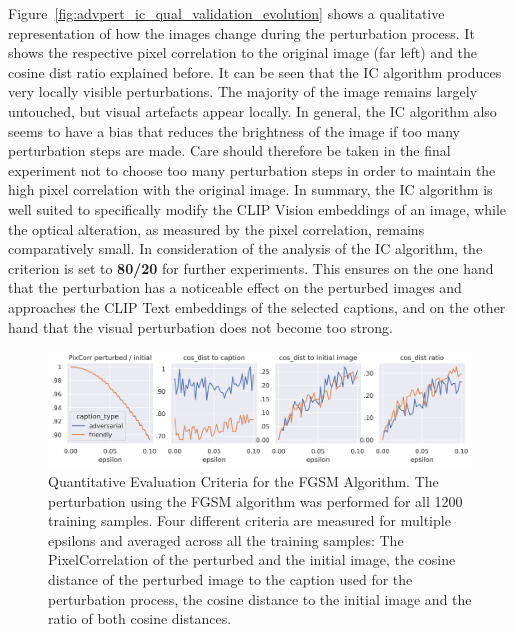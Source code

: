 Figure~\ref{fig:advpert_ic_qual_validation_evolution} shows a qualitative representation of how the images change during the perturbation process. It shows the respective pixel correlation to the original image (far left) and the cosine dist ratio explained before. It can be seen that the IC algorithm produces very locally visible perturbations. The majority of the image remains largely untouched, but visual artefacts appear locally. In general, the IC algorithm also seems to have a bias that reduces the brightness of the image if too many perturbation steps are made. Care should therefore be taken in the final experiment not to choose too many perturbation steps in order to maintain the high pixel correlation with the original image. In summary, the IC algorithm is well suited to specifically modify the CLIP Vision embeddings of an image, while the optical alteration, as measured by the pixel correlation, remains comparatively small. In consideration of the analysis of the IC algorithm, the criterion is set to \textbf{80/20} for further experiments. This ensures on the one hand that the perturbation has a noticeable effect on the perturbed images and approaches the CLIP Text embeddings of the selected captions, and on the other hand that the visual perturbation does not become too strong. 


\begin{figure}[ht]
    \centering
    \includegraphics[width=1\textwidth]{plots/advpert_validation_fgsm_loss_curves.png}
    \caption[Quantitative Evaluation Criteria for the FGSM Algorithm]{Quantitative Evaluation Criteria for the FGSM Algorithm. The perturbation using the FGSM algorithm was performed for all 1200 training samples. Four different criteria are measured for multiple epsilons and averaged across all the training samples: The PixelCorrelation of the perturbed and the initial image, the cosine distance of the perturbed image to the caption used for the perturbation process, the cosine distance to the initial image and the ratio of both cosine distances.}\label{fig:advpert_validation_fgsm_loss_curves}
\end{figure}


